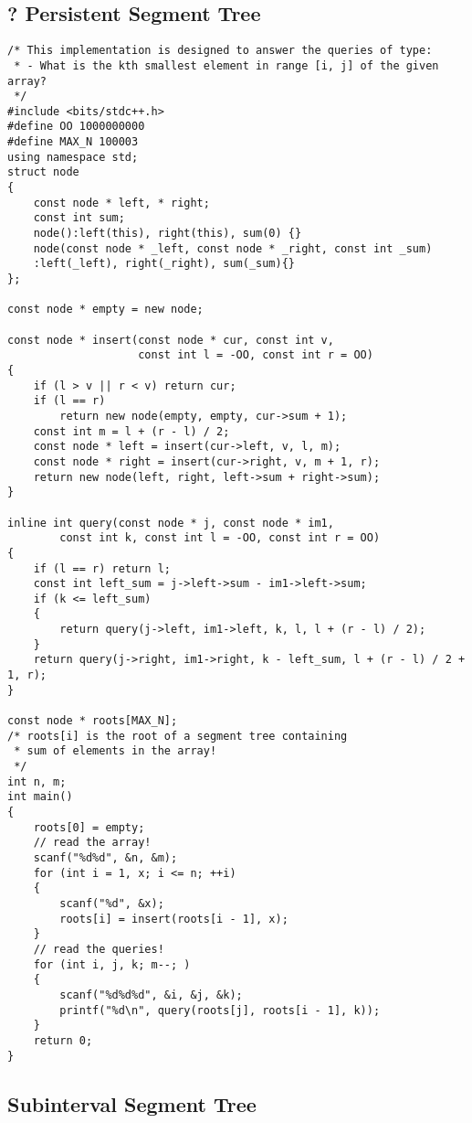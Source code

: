 \documentclass[12pt]{book}
\begin{document}
\subsection{? Persistent Segment Tree}
\begin{verbatim}
/* This implementation is designed to answer the queries of type:
 * - What is the kth smallest element in range [i, j] of the given array?
 */
#include <bits/stdc++.h>
#define OO 1000000000
#define MAX_N 100003
using namespace std;
struct node
{
	const node * left, * right;
	const int sum;
	node():left(this), right(this), sum(0) {}
	node(const node * _left, const node * _right, const int _sum)
	:left(_left), right(_right), sum(_sum){}
};

const node * empty = new node;

const node * insert(const node * cur, const int v,
                    const int l = -OO, const int r = OO)
{
	if (l > v || r < v) return cur;
	if (l == r)
		return new node(empty, empty, cur->sum + 1);
	const int m = l + (r - l) / 2;
	const node * left = insert(cur->left, v, l, m);
	const node * right = insert(cur->right, v, m + 1, r);
	return new node(left, right, left->sum + right->sum);
}

inline int query(const node * j, const node * im1,
		const int k, const int l = -OO, const int r = OO)
{
	if (l == r) return l;
	const int left_sum = j->left->sum - im1->left->sum;
	if (k <= left_sum)
	{
		return query(j->left, im1->left, k, l, l + (r - l) / 2);
	}
	return query(j->right, im1->right, k - left_sum, l + (r - l) / 2 + 1, r);
}

const node * roots[MAX_N];
/* roots[i] is the root of a segment tree containing
 * sum of elements in the array!
 */
int n, m;
int main()
{
	roots[0] = empty;
	// read the array!
	scanf("%d%d", &n, &m);
	for (int i = 1, x; i <= n; ++i)
	{
		scanf("%d", &x);
		roots[i] = insert(roots[i - 1], x);
	}
	// read the queries!
	for (int i, j, k; m--; )
	{
		scanf("%d%d%d", &i, &j, &k);
		printf("%d\n", query(roots[j], roots[i - 1], k));
	}
	return 0;
}
\end{verbatim}
\subsection{Subinterval Segment Tree}
\inputminted[frame = single, mathescape,  xleftmargin=-50pt, xrightmargin=-50pt]{cpp}{subinterval-segment-tree.cc}
\end{document}
